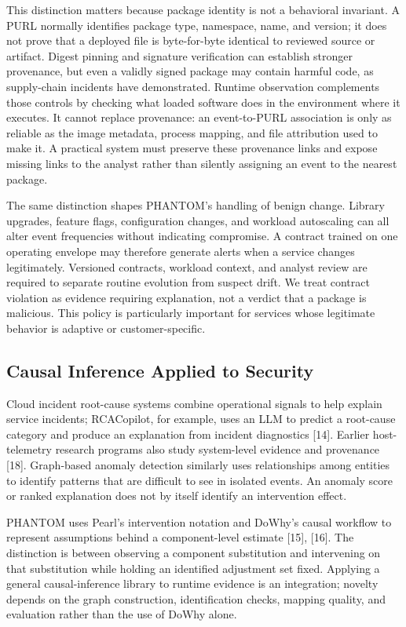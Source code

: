 \documentclass[conference]{IEEEtran}
\begin{document}
This distinction matters because package identity is not a behavioral invariant. A PURL normally identifies package type, namespace, name, and version; it does not prove that a deployed file is byte-for-byte identical to reviewed source or artifact. Digest pinning and signature verification can establish stronger provenance, but even a validly signed package may contain harmful code, as supply-chain incidents have demonstrated. Runtime observation complements those controls by checking what loaded software does in the environment where it executes. It cannot replace provenance: an event-to-PURL association is only as reliable as the image metadata, process mapping, and file attribution used to make it. A practical system must preserve these provenance links and expose missing links to the analyst rather than silently assigning an event to the nearest package.

The same distinction shapes PHANTOM's handling of benign change. Library upgrades, feature flags, configuration changes, and workload autoscaling can all alter event frequencies without indicating compromise. A contract trained on one operating envelope may therefore generate alerts when a service changes legitimately. Versioned contracts, workload context, and analyst review are required to separate routine evolution from suspect drift. We treat contract violation as evidence requiring explanation, not a verdict that a package is malicious. This policy is particularly important for services whose legitimate behavior is adaptive or customer-specific.

\subsection{Causal Inference Applied to Security}
Cloud incident root-cause systems combine operational signals to help explain service incidents; RCACopilot, for example, uses an LLM to predict a root-cause category and produce an explanation from incident diagnostics [14]. Earlier host-telemetry research programs also study system-level evidence and provenance [18]. Graph-based anomaly detection similarly uses relationships among entities to identify patterns that are difficult to see in isolated events. An anomaly score or ranked explanation does not by itself identify an intervention effect.

PHANTOM uses Pearl's intervention notation and DoWhy's causal workflow to represent assumptions behind a component-level estimate [15], [16]. The distinction is between observing a component substitution and intervening on that substitution while holding an identified adjustment set fixed. Applying a general causal-inference library to runtime evidence is an integration; novelty depends on the graph construction, identification checks, mapping quality, and evaluation rather than the use of DoWhy alone.
\end{document}
